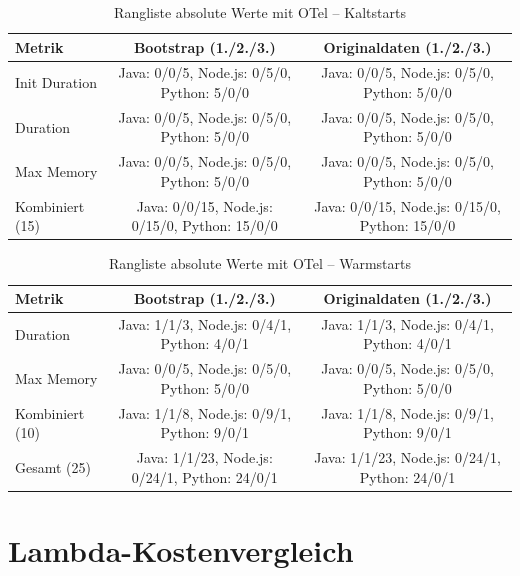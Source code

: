 \begin{table}[H]
\centering
\footnotesize
\setlength{\tabcolsep}{4pt}
\caption{Rangliste absolute Werte mit OTel – Kaltstarts}
\label{app:ranking-with-otel-cold}
\begin{tabular}{|l|cc|}
\hline
\textbf{Metrik} & \textbf{Bootstrap (1./2./3.)} & \textbf{Originaldaten (1./2./3.)} \\
\hline
Init Duration & Java: 0/0/5, Node.js: 0/5/0, Python: 5/0/0 & Java: 0/0/5, Node.js: 0/5/0, Python: 5/0/0 \\
\hline
Duration      & Java: 0/0/5, Node.js: 0/5/0, Python: 5/0/0 & Java: 0/0/5, Node.js: 0/5/0, Python: 5/0/0 \\
\hline
Max Memory    & Java: 0/0/5, Node.js: 0/5/0, Python: 5/0/0 & Java: 0/0/5, Node.js: 0/5/0, Python: 5/0/0 \\
\hline
Kombiniert (15) & Java: 0/0/15, Node.js: 0/15/0, Python: 15/0/0 & Java: 0/0/15, Node.js: 0/15/0, Python: 15/0/0 \\
\hline
\end{tabular}
\end{table}

\begin{table}[H]
\centering
\footnotesize
\setlength{\tabcolsep}{4pt}
\caption{Rangliste absolute Werte mit OTel – Warmstarts}
\label{app:ranking-with-otel-warm}
\begin{tabular}{|l|cc|}
\hline
\textbf{Metrik} & \textbf{Bootstrap (1./2./3.)} & \textbf{Originaldaten (1./2./3.)} \\
\hline
Duration      & Java: 1/1/3, Node.js: 0/4/1, Python: 4/0/1 & Java: 1/1/3, Node.js: 0/4/1, Python: 4/0/1 \\
\hline
Max Memory    & Java: 0/0/5, Node.js: 0/5/0, Python: 5/0/0 & Java: 0/0/5, Node.js: 0/5/0, Python: 5/0/0 \\
\hline
Kombiniert (10) & Java: 1/1/8, Node.js: 0/9/1, Python: 9/0/1 & Java: 1/1/8, Node.js: 0/9/1, Python: 9/0/1 \\
\hline
Gesamt (25)   & Java: 1/1/23, Node.js: 0/24/1, Python: 24/0/1 & Java: 1/1/23, Node.js: 0/24/1, Python: 24/0/1 \\
\hline
\end{tabular}
\end{table}

\section{Lambda-Kostenvergleich}
\label{app:cost-comparison}

